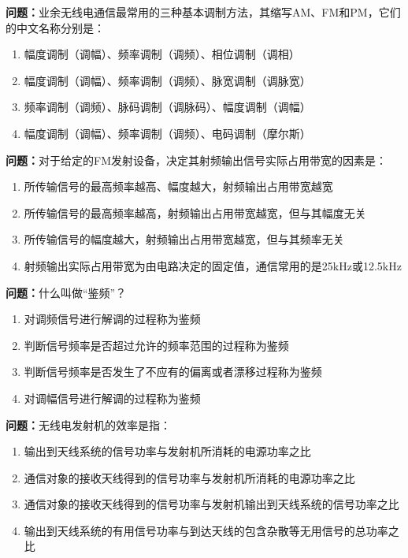 \documentclass{ctexbook}%
\begin{document}
\textbf{问题：}业余无线电通信最常用的三种基本调制方法，其缩写AM、FM和PM，它们的中文名称分别是：
\begin{enumerate}[label=\Alph*), leftmargin=3em]
\item 幅度调制（调幅）、频率调制（调频）、相位调制（调相）
\item 幅度调制（调幅）、频率调制（调频）、脉宽调制（调脉宽）
\item 频率调制（调频）、脉码调制（调脉码）、幅度调制（调幅）
\item 幅度调制（调幅）、频率调制（调频）、电码调制（摩尔斯）
\end{enumerate}

\textbf{问题：}对于给定的FM发射设备，决定其射频输出信号实际占用带宽的因素是：
\begin{enumerate}[label=\Alph*), leftmargin=3em]
\item 所传输信号的最高频率越高、幅度越大，射频输出占用带宽越宽
\item 所传输信号的最高频率越高，射频输出占用带宽越宽，但与其幅度无关
\item 所传输信号的幅度越大，射频输出占用带宽越宽，但与其频率无关
\item 射频输出实际占用带宽为由电路决定的固定值，通信常用的是25kHz或12.5kHz
\end{enumerate}

\textbf{问题：}什么叫做“鉴频”？
\begin{enumerate}[label=\Alph*), leftmargin=3em]
\item 对调频信号进行解调的过程称为鉴频
\item 判断信号频率是否超过允许的频率范围的过程称为鉴频
\item 判断信号频率是否发生了不应有的偏离或者漂移过程称为鉴频
\item 对调幅信号进行解调的过程称为鉴频
\end{enumerate}

\textbf{问题：}无线电发射机的效率是指：
\begin{enumerate}[label=\Alph*), leftmargin=3em]
\item 输出到天线系统的信号功率与发射机所消耗的电源功率之比
\item 通信对象的接收天线得到的信号功率与发射机所消耗的电源功率之比
\item 通信对象的接收天线得到的信号功率与发射机输出到天线系统的信号功率之比
\item 输出到天线系统的有用信号功率与到达天线的包含杂散等无用信号的总功率之比
\end{enumerate}
\end{document}
